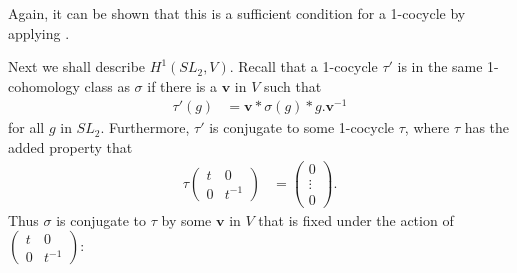 Again, it can be shown that this is a sufficient condition for a 1-cocycle by applying \cite[Proposition 2]{martin2004nonab}.

Next we shall describe $H^1(SL_2, V)$. Recall that a 1-cocycle $\tau'$ is in the same 1-cohomology class as $\sigma$ if there is a $\mathbf{v}$ in $V$ such that
\begin{align*}
\tau'(g) &= \mathbf{v}*\sigma(g)*g.\mathbf{v}^{-1}
\end{align*}
for all $g$ in $SL_2$. Furthermore, $\tau'$ is conjugate to some 1-cocycle $\tau$, where $\tau$ has the added property that
\begin{align*}
\tau\left(\begin{matrix}t & 0 \\ 0 & t^{-1}\end{matrix}\right) &= \left(\begin{matrix} 0 \\ \vdots \\ 0\end{matrix}\right).
\end{align*}
Thus $\sigma$ is conjugate to $\tau$ by some $\mathbf{v}$ in $V$ that is fixed under the action of $\left(\begin{matrix}t & 0 \\ 0 & t^{-1}\end{matrix}\right)$:
